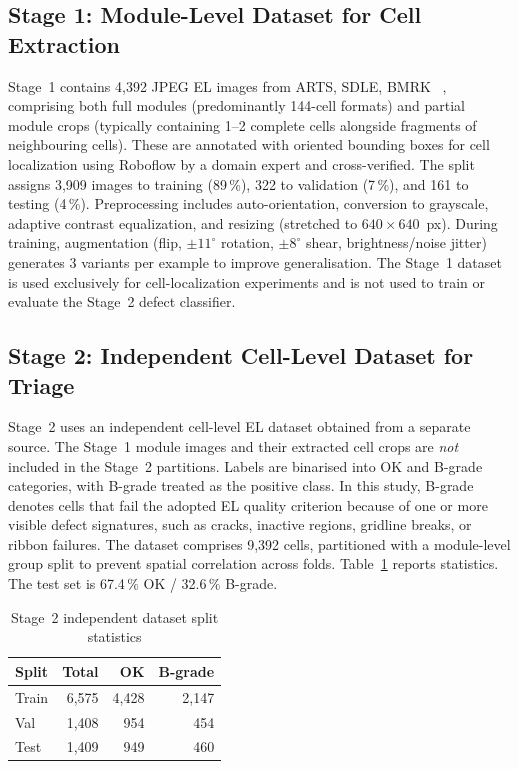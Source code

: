 \documentclass[conference]{IEEEtran}
\begin{document}
\subsection{Stage 1: Module-Level Dataset for Cell Extraction}
Stage~1 contains 4{,}392 JPEG EL images from ARTS, SDLE, BMRK ~\cite{pratt2023benchmark}, comprising both full modules (predominantly 144-cell formats) and partial module crops (typically containing 1--2 complete cells alongside fragments of neighbouring cells). These are annotated with oriented bounding boxes for cell localization using Roboflow by a domain expert and cross-verified. The split assigns 3{,}909 images to training (89\,\%), 322 to validation (7\,\%), and 161 to testing (4\,\%). Preprocessing includes auto-orientation, conversion to grayscale, adaptive contrast equalization, and resizing (stretched to $640\times640$~px). During training, augmentation (flip, $\pm11^\circ$ rotation, $\pm8^\circ$ shear, brightness/noise jitter) generates 3 variants per example to improve generalisation. The Stage~1 dataset is used exclusively for cell-localization experiments and is not used to train or evaluate the Stage~2 defect classifier.

\subsection{Stage 2: Independent Cell-Level Dataset for Triage}
Stage~2 uses an independent cell-level EL dataset obtained from a separate source. The Stage~1 module images and their extracted cell crops are \textit{not} included in the Stage~2 partitions. Labels are binarised into OK and B-grade categories, with B-grade treated as the positive class. In this study, B-grade denotes cells that fail the adopted EL quality criterion because of one or more visible defect signatures, such as cracks, inactive regions, gridline breaks, or ribbon failures. The dataset comprises 9{,}392 cells, partitioned with a module-level group split to prevent spatial correlation across folds. Table~\ref{tab:datasplit} reports statistics. The test set is 67.4\,\% OK / 32.6\,\% B-grade.

\begin{table}[t]
  \caption{Stage~2 independent dataset split statistics}
  \label{tab:datasplit}
  \begin{center}
  \renewcommand{\arraystretch}{1.05}\small
  \begin{tabular}{lrrr}
    \toprule
    \textbf{Split} & \textbf{Total} & \textbf{OK} & \textbf{B-grade}\\
    \midrule
    Train & 6{,}575 & 4{,}428 & 2{,}147\\
    Val   & 1{,}408 &   954   &   454\\
    Test  & 1{,}409 &   949   &   460\\
    \bottomrule
  \end{tabular}
  \end{center}
\end{table}
\end{document}
